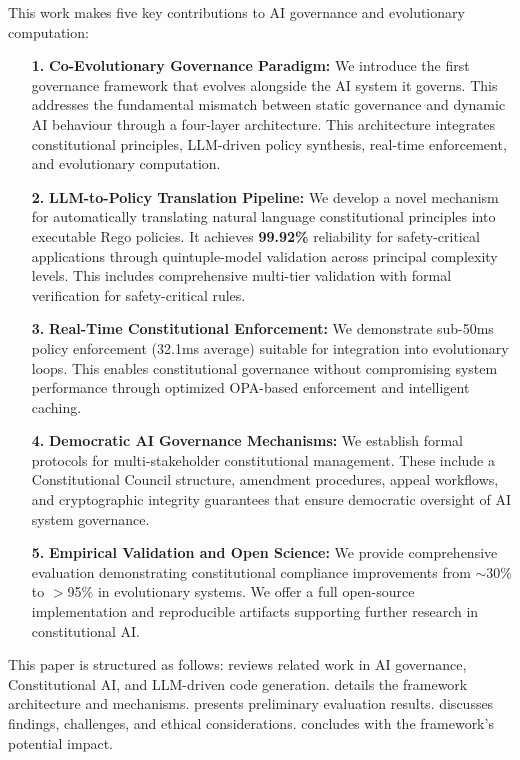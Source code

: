 \documentclass[manuscript,screen,review,anonymous,9pt]{acmart}
\begin{document}
This work makes five key contributions to AI governance and evolutionary computation:
\begin{itemize}
	\item[\textbf{1.}] \textbf{Co-Evolutionary Governance Paradigm:} We introduce the first governance framework that evolves alongside the AI system it governs. This addresses the fundamental mismatch between static governance and dynamic AI behaviour through a four-layer architecture. This architecture integrates constitutional principles, LLM-driven policy synthesis, real-time enforcement, and evolutionary computation.
	\item[\textbf{2.}] \textbf{LLM-to-Policy Translation Pipeline:} We develop a novel mechanism for automatically translating natural language constitutional principles into executable Rego policies. It achieves \textbf{99.92\%} reliability for safety-critical applications through quintuple-model validation across principal complexity levels. This includes comprehensive multi-tier validation with formal verification for safety-critical rules.
	\item[\textbf{3.}] \textbf{Real-Time Constitutional Enforcement:} We demonstrate sub-50ms policy enforcement (32.1ms average) suitable for integration into evolutionary loops. This enables constitutional governance without compromising system performance through optimized OPA-based enforcement and intelligent caching.
	\item[\textbf{4.}] \textbf{Democratic AI Governance Mechanisms:} We establish formal protocols for multi-stakeholder constitutional management. These include a Constitutional Council structure, amendment procedures, appeal workflows, and cryptographic integrity guarantees that ensure democratic oversight of AI system governance.
	\item[\textbf{5.}] \textbf{Empirical Validation and Open Science:} We provide comprehensive evaluation demonstrating constitutional compliance improvements from $\sim$30\% to $>$95\% in evolutionary systems. We offer a full open-source implementation and reproducible artifacts supporting further research in constitutional AI.
\end{itemize}

This paper is structured as follows:  reviews related work in AI governance, Constitutional AI, and LLM-driven code generation.  details the framework architecture and mechanisms.  presents preliminary evaluation results.  discusses findings, challenges, and ethical considerations.  concludes with the framework's potential impact.
\end{document}
